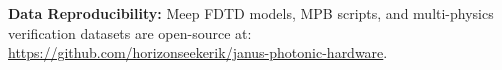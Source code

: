 \documentclass[letterpaper,10pt]{article}
\begin{document}
\noindent\textbf{Data Reproducibility:} Meep FDTD models, MPB scripts, and multi-physics verification datasets are open-source at: \url{https://github.com/horizonseekerik/janus-photonic-hardware}.

\vspace{-4pt}
\begingroup
\fontsize{6.6pt}{7.6pt}\selectfont


\endgroup
\end{document}
